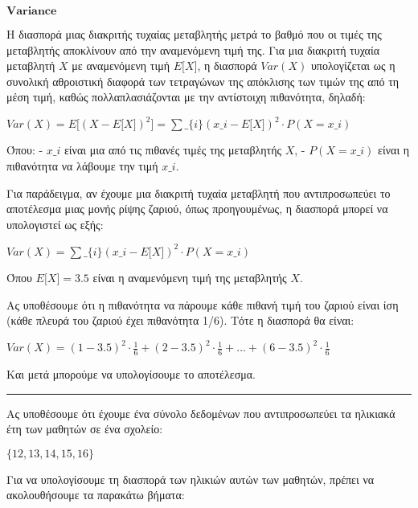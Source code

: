 \documentclass[11pt]{article}
\makeatletter
\newcommand{\boxspacing}{\kern\kvtcb@left@rule\kern\kvtcb@boxsep}
\newcommand{\prompt}[4]{
        {\ttfamily\llap{{\color{#2}[#3]:\hspace{3pt}#4}}\vspace{-\baselineskip}}
    }
\makeatother
\begin{document}
    \begin{tcolorbox}[breakable, size=fbox, boxrule=1pt, pad at break*=1mm,colback=cellbackground, colframe=cellborder]
\prompt{In}{incolor}{ }{\boxspacing}
\begin{Verbatim}[commandchars=\\\{\}]

\end{Verbatim}
\end{tcolorbox}

    \(\textbf{Variance}\)

    Η διασπορά μιας διακριτής τυχαίας μεταβλητής μετρά το βαθμό που οι τιμές
της μεταβλητής αποκλίνουν από την αναμενόμενη τιμή της. Για μια διακριτή
τυχαία μεταβλητή $ X $ με αναμενόμενη τιμή $ E{[}X{]} $, η διασπορά
$ Var(X) $ υπολογίζεται ως η συνολική αθροιστική διαφορά των
τετραγώνων της απόκλισης των τιμών της από τη μέση τιμή, καθώς
πολλαπλασιάζονται με την αντίστοιχη πιθανότητα, δηλαδή:

$ Var(X) = E{[}(X - E{[}X{]})^2{]} = \sum\_\{i\} (x\_i - E{[}X{]})^2 \cdot P(X = x\_i) $

Όπου: - $ x\_i $ είναι μια από τις πιθανές τιμές της μεταβλητής $ X
$, - $ P(X = x\_i) $ είναι η πιθανότητα να λάβουμε την τιμή $ x\_i
$.

Για παράδειγμα, αν έχουμε μια διακριτή τυχαία μεταβλητή που
αντιπροσωπεύει το αποτέλεσμα μιας μονής ρίψης ζαριού, όπως προηγουμένως,
η διασπορά μπορεί να υπολογιστεί ως εξής:

$ Var(X) = \sum\_\{i\} (x\_i - E{[}X{]})^2 \cdot P(X = x\_i) $

Όπου $ E{[}X{]} = 3.5 $ είναι η αναμενόμενη τιμή της μεταβλητής $ X
$.

Ας υποθέσουμε ότι η πιθανότητα να πάρουμε κάθε πιθανή τιμή του ζαριού
είναι ίση (κάθε πλευρά του ζαριού έχει πιθανότητα 1/6). Τότε η διασπορά
θα είναι:

$ Var(X) = (1 - 3.5)^2 \cdot \frac{1}{6} + (2 - 3.5)^2
\cdot \frac{1}{6} + \ldots + (6 - 3.5)^2 \cdot \frac{1}{6} $

Και μετά μπορούμε να υπολογίσουμε το αποτέλεσμα.

\begin{center}\rule{0.5\linewidth}{0.5pt}\end{center}

Ας υποθέσουμε ότι έχουμε ένα σύνολο δεδομένων που αντιπροσωπεύει τα
ηλικιακά έτη των μαθητών σε ένα σχολείο:

$ \{12, 13, 14, 15, 16\} $

Για να υπολογίσουμε τη διασπορά των ηλικιών αυτών των μαθητών, πρέπει να
ακολουθήσουμε τα παρακάτω βήματα:
\end{document}
